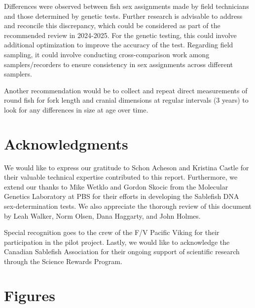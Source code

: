 \documentclass[12pt]{article}\usepackage[]{graphicx}\usepackage[]{color}
\begin{document}
Differences were observed between fish sex assignments made by field technicians and those determined by genetic tests. Further research is advisable to address and reconcile this discrepancy, which could be considered as part of the recommended review in 2024-2025. For the genetic testing, this could involve additional optimization to improve the accuracy of the test. Regarding field sampling, it could involve conducting cross-comparison work among samplers/recorders to ensure consistency in sex assignments across different samplers.

Another recommendation would be to collect and repeat direct measurements of round fish for fork length and cranial dimensions at regular intervals (3 years) to look for any differences in size at age over time.

\hypertarget{acknowledgments}{%
\section{Acknowledgments}\label{acknowledgments}}

We would like to express our gratitude to Schon Acheson and Kristina Castle for their valuable technical expertise contributed to this report. Furthermore, we extend our thanks to Mike Wetklo and Gordon Skocic from the Molecular Genetics Laboratory at PBS for their efforts in developing the Sablefish DNA sex-determination tests. We also appreciate the thorough review of this document by Leah Walker, Norm Olsen, Dana Haggarty, and John Holmes.

Special recognition goes to the crew of the F/V Pacific Viking for their participation in the pilot project. Lastly, we would like to acknowledge the Canadian Sablefish Association for their ongoing support of scientific research through the Science Rewards Program.

\clearpage

\hypertarget{figures}{%
\section{Figures}\label{figures}}
\end{document}
